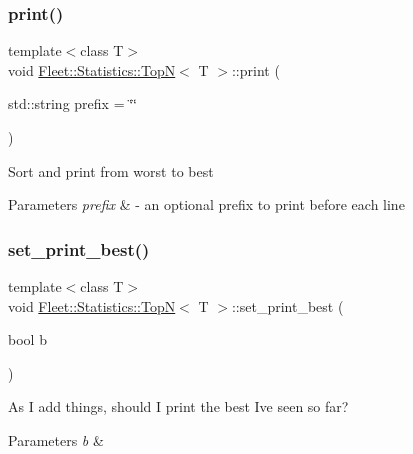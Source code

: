 \subsubsection{\texorpdfstring{print()}{print()}}
{\footnotesize\ttfamily template$<$class T$>$ \\
void \hyperlink{class_fleet_1_1_statistics_1_1_top_n}{Fleet\+::\+Statistics\+::\+TopN}$<$ T $>$\+::print (\begin{DoxyParamCaption}\item[{std\+::string}]{prefix = {\ttfamily \char`\"{}\char`\"{}} }\end{DoxyParamCaption})\hspace{0.3cm}{\ttfamily [inline]}}

Sort and print from worst to best 
\begin{DoxyParams}{Parameters}
{\em prefix} & -\/ an optional prefix to print before each line\\
\hline
\end{DoxyParams}
\mbox{\label{class_fleet_1_1_statistics_1_1_top_n_a762c937fe5dcab09d87d2414201b6b1e}} 
\subsubsection{\texorpdfstring{set\+\_\+print\+\_\+best()}{set\_print\_best()}}
{\footnotesize\ttfamily template$<$class T$>$ \\
void \hyperlink{class_fleet_1_1_statistics_1_1_top_n}{Fleet\+::\+Statistics\+::\+TopN}$<$ T $>$\+::set\+\_\+print\+\_\+best (\begin{DoxyParamCaption}\item[{bool}]{b }\end{DoxyParamCaption})\hspace{0.3cm}{\ttfamily [inline]}}

As I add things, should I print the best I\textquotesingle{}ve seen so far? 
\begin{DoxyParams}{Parameters}
{\em b} & \\
\hline
\end{DoxyParams}
\mbox{\label{class_fleet_1_1_statistics_1_1_top_n_a3151da8c2aaab75195d6f702fbfba436}} 
